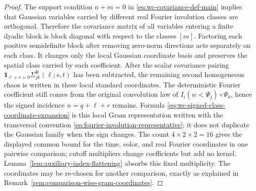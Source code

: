 \documentclass[10pt]{amsart}
\numberwithin{equation}{section}
\theoremstyle{plain}
\theoremstyle{definition}
\theoremstyle{remark}
\begin{document}
\begin{proof}
The support condition \(n+m=0\) in \eqref{eq:wc-covariance-def-main} implies that Gaussian variables carried by different real Fourier involution classes are orthogonal.  Therefore the covariance matrix of all variables entering a finite dyadic block is block diagonal with respect to the classes \([m]\).  Factoring each positive semidefinite block after removing zero-norm directions acts separately on each class.  It changes only the local Gaussian coordinate basis and preserves the spatial class carried by each coefficient.  After the scalar covariance pairing \(\mathbf 1_{\ell+r=0}\Sigma_{jk}^{\mathsf R}(\ell;s,t)\) has been subtracted, the remaining second homogeneous chaos is written in these local standard coordinates.  The deterministic Fourier coefficient still comes from the original convolution law of \(I_i(w<\Psi_j)\circ\Psi_k\), hence the signed incidence \(n=q+\ell+r\) remains.  Formula \eqref{eq:wc-signed-class-coordinate-expansion} is this local Gram representation written with the transversal convention \eqref{eq:fourier-involution-representative}; it does not duplicate the Gaussian family when the sign changes.  The count $4\times2\times2=16$ gives the displayed common bound for the time, color, and real Fourier coordinates in one pairwise comparison; cutoff multipliers change coefficients but add no kernel.  Lemma~\ref{lem:auxiliary-index-flattening} absorbs this fixed multiplicity.  The coordinates may be re-chosen for another comparison, exactly as explained in Remark~\ref{rem:comparison-wise-gram-coordinates}.
\end{proof}
\end{document}
